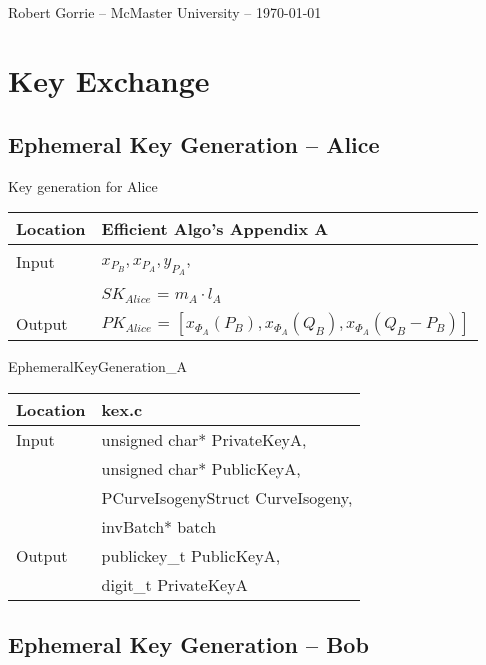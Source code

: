 \documentclass[10pt]{article}
\begin{document}
\begin{center}
\large {}\\
\normalsize {Robert Gorrie -- McMaster University -- \today}\\
\end{center}
\hline
{}


\section{Key Exchange}

\subsection{Ephemeral Key Generation -- Alice}

	\parbox[t]{.35\linewidth}{
	\centering
	Key generation for Alice
	\begin{tabular}{@{}ll@{}}
		\toprule
		Location & Efficient Algo's Appendix A \\
		\midrule
		Input & $x_{P_{B}}, x_{P_{A}}, y_{P_{A}}$,\\
		& $SK_{Alice}$ = $m_{A} \cdot l_{A}$\\
		\midrule
		Output & $PK_{Alice}$ = $[x_{\Phi_{A}}(P_{B}), x_{\Phi_{A}}(Q_{B}), x_{\Phi_{A}}(Q_{B} - P_{B})]$\\
		\bottomrule
	\end{tabular}}
	\hfill
	\parbox[t]{.35\linewidth}{
	\centering
	EphemeralKeyGeneration\_A
	\begin{tabular}{@{}ll@{}}
		\toprule
		Location & kex.c \\
		\midrule
		Input & unsigned char* PrivateKeyA,\\
		& unsigned char* PublicKeyA,\\
		& PCurveIsogenyStruct CurveIsogeny,\\
		& invBatch* batch\\
		\midrule
		Output & publickey\_t PublicKeyA,\\
		& digit\_t PrivateKeyA\\
		\bottomrule
	\end{tabular}}

\subsection{Ephemeral Key Generation -- Bob}
\end{document}
